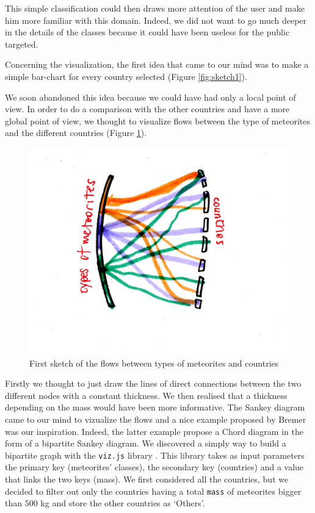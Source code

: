 \documentclass[10pt,conference,compsocconf]{IEEEtran}
\begin{document}
 This simple classification could then draws more attention of the user and make him more familiar with this domain. Indeed, we did not want to go much deeper in the details of the classes because it could have been useless for the public targeted.

Concerning the visualization, the first idea that came to our mind was to make a simple bar-chart for every country selected (Figure \ref{fig:sketch1}).
 
We soon abandoned this idea because we could have had only a local point of view. In order to do a comparison with the other countries and have a more global point of view, we thought to visualize flows between the type of meteorites and the different countries (Figure \ref{fig:bipartitesketch}). 

\begin{figure}[]
  \centering
  \includegraphics[width=\columnwidth]{images/bipartite}
  \vspace{-3mm}
  \caption{First sketch of the flows between types of meteorites and countries}
  \label{fig:bipartitesketch}
\end{figure}

Firstly we thought to just draw the lines of direct connections between the two different nodes with a constant thickness. We then realised that a thickness depending on the mass would have been more informative. The Sankey diagram came to our mind to vizualize the flows and a nice example proposed by Bremer \cite{BibEntry2017Dec} was our inspiration. Indeed, the latter example propose a Chord diagram in the form of a bipartite Sankey diagram. We discovered a simply way to build a bipartite graph with the \texttt{viz.js} library \cite{bipartite_viz}. This library takes as input parameters the primary key (meteorites' classes), the secondary key (countries) and a value that links the two keys (mass). We first considered all the countries, but we decided to filter out only the countries having a total \texttt{mass} of meteorites bigger than $500$ kg and store the other countries as `Others'.
\end{document}
